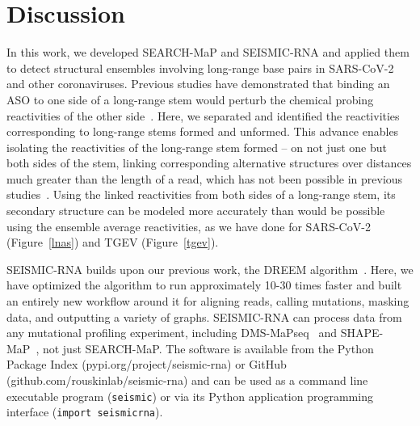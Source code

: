 \documentclass[main.tex]{subfiles}
\begin{document}
\section{Discussion}

In this work, we developed SEARCH-MaP and SEISMIC-RNA and applied them to detect structural ensembles involving long-range base pairs in SARS-CoV-2 and other coronaviruses.
Previous studies have demonstrated that binding an ASO to one side of a long-range stem would perturb the chemical probing reactivities of the other side~\cite{Legiewicz2010,Archer2013,Bai2014}.
Here, we separated and identified the reactivities corresponding to long-range stems formed and unformed.
This advance enables isolating the reactivities of the long-range stem formed -- on not just one but both sides of the stem, linking corresponding alternative structures over distances much greater than the length of a read, which has not been possible in previous studies~\cite{Tomezsko2020,Morandi2021}.
Using the linked reactivities from both sides of a long-range stem, its secondary structure can be modeled more accurately than would be possible using the ensemble average reactivities, as we have done for SARS-CoV-2 (Figure~\ref{lnas}) and TGEV (Figure~\ref{tgev}).

SEISMIC-RNA builds upon our previous work, the DREEM algorithm~\cite{Tomezsko2020}.
Here, we have optimized the algorithm to run approximately 10-30 times faster and built an entirely new workflow around it for aligning reads, calling mutations, masking data, and outputting a variety of graphs.
SEISMIC-RNA can process data from any mutational profiling experiment, including DMS-MaPseq~\cite{Zubradt2016} and SHAPE-MaP~\cite{Siegfried2014}, not just SEARCH-MaP.
The software is available from the Python Package Index (pypi.org/project/seismic-rna) or GitHub (github.com/rouskinlab/seismic-rna) and can be used as a command line executable program (\verb|seismic|) or via its Python application programming interface (\verb|import seismicrna|).
\end{document}
